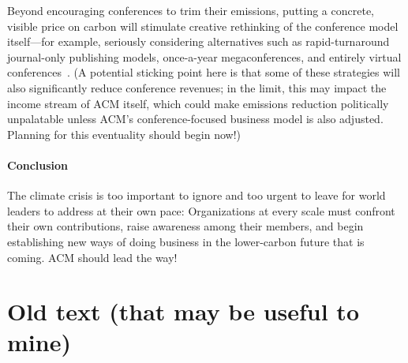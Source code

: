 \documentclass[12pt]{article}
\newcommand{\bcp}[1]{\ifdraft{\bf [bcp: #1]}\fi}
\newcommand{\SECTION}{\paragraph*}
\begin{document}
Beyond encouraging conferences to trim their emissions, putting a concrete,
visible price on 
carbon will stimulate creative rethinking of the conference model
itself---for example, seriously considering alternatives such as
rapid-turnaround journal-only publishing models, once-a-year
megaconferences, and entirely virtual conferences~\cite{NCN}.
%
(A potential sticking point here is that some of these strategies will also
significantly reduce conference revenues; in the limit, this may impact the
income stream of ACM itself, which could make emissions reduction
politically unpalatable unless ACM's conference-focused business model is
also adjusted.  Planning for this eventuality should begin now!)





\SECTION{Conclusion}


The climate crisis is too important to ignore and too urgent to leave for
world leaders to address at their own pace: Organizations at every scale
must confront their own contributions, raise awareness among their members,
and begin establishing new ways of doing business in the lower-carbon future
that is coming.  ACM should lead the way!



\newpage

\section*{Old text (that may be useful to mine)}
\end{document}
